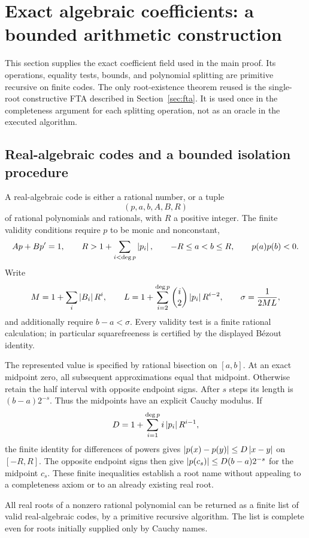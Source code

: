 \section{Exact algebraic coefficients: a bounded arithmetic construction}
\label{sec:backend}

This section supplies the exact coefficient field used in the main proof.
Its operations, equality tests, bounds, and polynomial splitting are
primitive recursive on finite codes. The only root-existence theorem reused
is the single-root constructive FTA described in Section~\ref{sec:fta}.
It is used once in the completeness argument for each splitting operation,
not as an oracle in the executed algorithm.

\subsection{Real-algebraic codes and a bounded isolation procedure}

A real-algebraic code is either a rational number, or a tuple
\[
 (p,a,b,A,B,R)
\]
of rational polynomials and rationals, with $R$ a positive integer.
The finite validity conditions require $p$ to be monic and nonconstant,
\[
 Ap+Bp'=1,\qquad
 R>1+\sum_{i<\deg p}\left|p_i\right|,\qquad
 -R\le a<b\le R,\qquad p(a)p(b)<0.
\]
Write
\[
 M=1+\sum_i\left|B_i\right|R^i,\qquad
 L=1+\sum_{i=2}^{\deg p}\binom i2\left|p_i\right|R^{i-2},
 \qquad \sigma=\frac1{2ML},
\]
and additionally require $b-a<\sigma$.
Every validity test is a finite rational calculation; in particular
squarefreeness is certified by the displayed B\'ezout identity.

The represented value is specified by rational bisection on $[a,b]$.
At an exact midpoint zero, all subsequent approximations equal that
midpoint. Otherwise retain the half interval with opposite endpoint signs.
After $s$ steps its length is $(b-a)2^{-s}$. Thus the midpoints have an
explicit Cauchy modulus. If
\[
 D=1+\sum_{i=1}^{\deg p}i\left|p_i\right|R^{i-1},
\]
the finite identity for differences of powers gives
$\left|p(x)-p(y)\right|\le D\left|x-y\right|$ on $[-R,R]$.
The opposite endpoint signs then give
$\left|p(c_s)\right|\le D(b-a)2^{-s}$ for the midpoint $c_s$.
These finite inequalities establish a root name without appealing to a
completeness axiom or to an already existing real root.

\begin{lemma}
\label{lem:backend-isolation}
All real roots of a nonzero rational polynomial can be returned as a finite
list of valid real-algebraic codes, by a primitive recursive algorithm.
The list is complete even for roots initially supplied only by Cauchy names.
\end{lemma}

